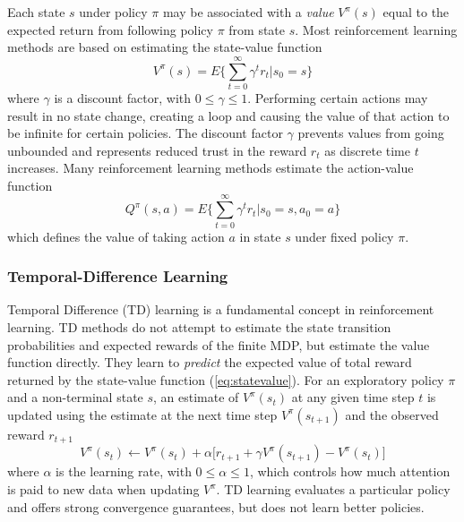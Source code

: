 Each state $s$ under policy $\pi$ may be associated with a \textit{value}
$V^\pi(s)$ equal to the expected return from following policy $\pi$ from state
$s$.  Most reinforcement learning methods are based on estimating the
state-value function
\begin{equation}
\label{eq:statevalue}
V^\pi(s) = E \Bigg\lbrace \sum^\infty_{t=0} \gamma^t r_t \Bigg\vert s_0 = s
\Bigg\rbrace
\end{equation}
where $\gamma$ is a discount factor, with $0\leq \gamma \leq 1$.
Performing certain actions may result in no state change, creating a loop and
causing the value of that action to be infinite for certain policies.
The discount factor $\gamma$ prevents values from going unbounded and
represents reduced trust in the reward $r_t$ as discrete time $t$
increases.  Many reinforcement learning methods estimate the action-value
function
\begin{equation}
\label{eq:actionvalue}
Q^\pi(s,a) = E \Bigg\lbrace \sum^\infty_{t=0} \gamma^t r_t \Bigg\vert s_0 = s,
a_0 = a \Bigg\rbrace
\end{equation}
which defines the value of taking action $a$ in state $s$ under fixed policy
$\pi$.

\subsubsection{Temporal-Difference Learning}
Temporal Difference (TD) learning is a fundamental concept in reinforcement
learning. TD methods do not attempt to estimate the state transition probabilities and
expected rewards of the finite MDP, but estimate the value function directly.
They learn to \textit{predict} the expected value of total reward returned by
the state-value function (\ref{eq:statevalue}).  For an exploratory policy $\pi$
and a non-terminal state $s$, an estimate of $V^\pi(s_t)$ at any given time step
$t$ is updated using the estimate at the next time step $V^\pi(s_{t+1})$ and the
observed reward $r_{t+1}$
\begin{equation}
V^\pi(s_t) \leftarrow V^\pi(s_t) + \alpha \bigl[r_{t+1} + \gamma
V^\pi(s_{t+1}) - V^\pi(s_t) \bigr]
\end{equation}
where $\alpha$ is the learning rate, with $0 \leq \alpha \leq 1$, which controls
how much attention is paid to new data when updating $V^\pi$.  TD learning
evaluates a particular policy and offers strong convergence guarantees, but does
not learn better policies.

